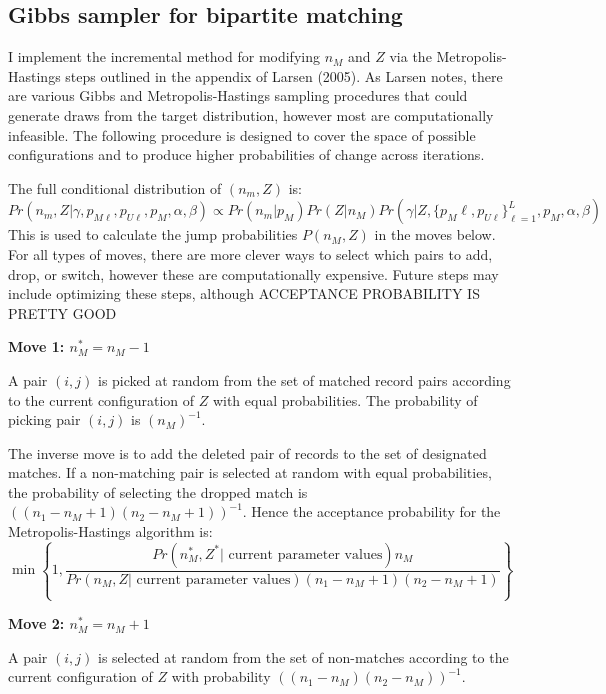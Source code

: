 \documentclass[11pt,reqno]{amsart}
\begin{document}
\subsection{Gibbs sampler for bipartite matching}
I implement the incremental method for modifying $n_M$ and $Z$ via the Metropolis-Hastings steps outlined in the appendix of Larsen (2005).  As Larsen notes, there are various Gibbs and Metropolis-Hastings sampling procedures that could generate draws from the target distribution, however most are computationally infeasible.  The following procedure is designed to cover the space of possible configurations and to produce higher probabilities of change across iterations.  

The full conditional distribution of $(n_m, Z)$ is:
\begin{equation} 
Pr\left(n_m, Z | \gamma, p_{M\ell}, p_{U\ell}, p_M, \alpha, \beta \right) \propto Pr(n_m | p_M) Pr(Z | n_M) Pr\left(\gamma | Z,  \{p_M{\ell}, p_{U\ell}\}_{\ell=1}^L, p_M, \alpha, \beta \right) \label{nmZ} \end{equation}
This is used to calculate the jump probabilities $P(n_M, Z) $ in the moves below.  For all types of moves, there are more clever ways to select which pairs to add, drop, or switch, however these are computationally expensive.  Future steps may include optimizing these steps, although ACCEPTANCE PROBABILITY IS PRETTY GOOD %

\textbf{Move 1: $n_M^* = n_M - 1 $ }

A pair $(i,j)$ is picked at random from the set of matched record pairs according to the current configuration of $Z$ with equal probabilities.  The probability of picking pair $(i,j)$ is $(n_M)^{-1}$. 

The inverse move is to add the deleted pair of records to the set of designated matches.  If a non-matching pair is selected at random with equal probabilities, the probability of selecting the dropped match is $\left((n_1 - n_M + 1)(n_2 - n_M + 1)\right)^{-1}$.  Hence the acceptance probability for the Metropolis-Hastings algorithm is:
\[ \min \left\{ 1, \frac{Pr\left(n_M^*, Z^* | \text{ current parameter values}\right)  n_M}{Pr\left(n_M, Z | \text{ current parameter values}\right) (n_1 - n_M + 1)(n_2 - n_M + 1)}\right\} \] 

\textbf{Move 2: $n_M^* = n_M + 1 $ }

A pair $(i,j)$ is selected at random from the set of non-matches according to the current configuration of $Z$ with probability $\left((n_1-n_M)(n_2-n_M)\right)^{-1}$.  
\end{document}
